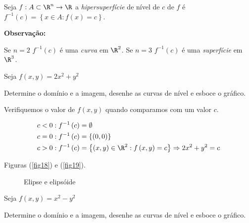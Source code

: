 \documentclass{book}
\begin{document}
\begin{defn}
    Seja $f:A \subset \R^n  \to \R$ a \textit{hipersuperf\'icie} de n\'ivel de $c$ de $f$ \'e $f^{ - 1} \left( c \right) = \left\{ {x \in A:f\left( x \right) = c} \right\}$.
\end{defn}

\textbf{Observa\c c\~ao:}

Se $n=2$ $f^{ - 1} \left( c \right)$ \'e uma \textit{curva} em $\R^2$.
Se $n=3$ $f^{ - 1} \left( c \right)$ \'e uma \textit{superf\'icie} em $\R^3$.

\begin{ex}
Seja $f\left( {x,y} \right) = 2x^2  + y^2$

Determine o dom\'inio e a imagem, desenhe as curvas de n\'ivel e esboce o gr\'afico.
\end{ex}

\begin{sol}
    Verifiquemos o valor de $f\left( {x,y} \right)$ quando comparamos com um valor $c$.

\[
\begin{gathered}
c < 0:f^{ - 1} \left( c \right) = \emptyset  \hfill \\
  c = 0:f^{ - 1} \left( c \right) = \left\{ {\left( {0,0} \right)} \right\} \hfill \\
  c > 0:f^{ - 1} \left( c \right) = \left\{ {\left( {x,y} \right) \in \R^2 :f\left( {x,y} \right) = c} \right\} \Rightarrow 2x^2  + y^2  = c \hfill \\
\end{gathered}
\]

Figuras (\ref{fig18}) e (\ref{fig19}).

\begin{figure}[!h]
  \centering
  \quad
  \caption{Elipse e elips\'oide}
\end{figure}

\end{sol}

\begin{ex}
Seja $f\left( {x,y} \right) = x^2 - y^2$

Determine o dom\'inio e a imagem, desenhe as curvas de n\'ivel e esboce o gr\'afico.
\end{ex}

\newpage 
\end{document}
